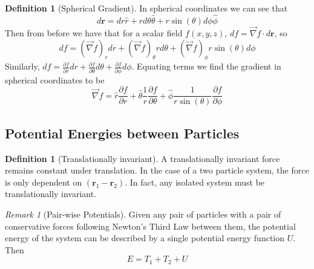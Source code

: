 \documentclass[12pt]{article}
\theoremstyle{definition}
\newtheorem{defn}[thm]{Definition}
\theoremstyle{remark}
\newtheorem{rmk}[thm]{Remark}
\numberwithin{equation}{section}
\newcommand\B[1]{\textbf{#1}}
\begin{document}
\begin{defn}[Spherical Gradient]
        In spherical coordinates we can see that $$d\B{r} = dr\hat{r} + rd\theta\hat{\theta}+r\sin(\theta)d\phi\hat{\phi}$$
        Then from before we have that for a scalar field $f(x,y,z)$, $df = \vec{\nabla}f\cdot d\B{r}$, so \begin{equation}
                df = \left(\vec{\nabla}f\right)_{r}dr + \left(\vec{\nabla}f\right)_{\theta}rd\theta + \left(\vec{\nabla}f\right)_{\phi}r\sin(\theta)d\phi
        \end{equation}
        Similarly, $df = \frac{\partial f}{\partial r}dr+\frac{\partial f}{\partial \theta}d\theta + \frac{\partial f}{\partial \phi}d\phi$. Equating terms we find the gradient in spherical coordinates to be \begin{equation}
                \vec{\nabla}f = \hat{r}\frac{\partial f}{\partial r} + \hat{\theta}\frac{1}{r}\frac{\partial f}{\partial \theta} + \hat{\phi}\frac{1}{r\sin(\theta)}\frac{\partial f}{\partial \phi}
        \end{equation}
\end{defn}



\vspace{15pt}

\subsection{Potential Energies between Particles}


\begin{defn}[Translationally invariant]
        A translationally invariant force remains constant under translation. In the case of a two particle system, the force is only dependent on $(\B{r}_1 - \B{r}_2)$. In fact, any isolated system must be translationally invariant.
\end{defn}


\vspace{15pt}

\begin{rmk}[Pair-wise Potentials]
        Given any pair of particles with a pair of conservative forces following Newton's Third Law between them, the potential energy of the system can be described by a single potential energy function $U$. Then \begin{equation}
                E = T_1 + T_2 + U
        \end{equation}
\end{rmk}
\end{document}
